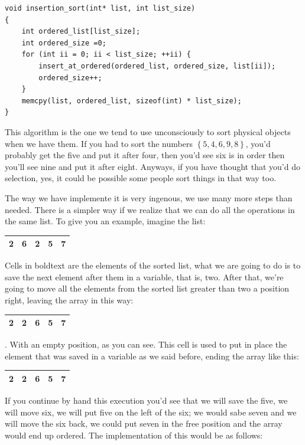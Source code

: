 \documentclass[a4paper]{article}
\begin{document}
\noindent
\begin{minipage}[H]{\linewidth}
\mbox{}
\begin{lstlisting}[style=C,
caption={Insert algorithm},
label={lst:insertionSort}]
void insertion_sort(int* list, int list_size)
{
    int ordered_list[list_size];
    int ordered_size =0;
    for (int ii = 0; ii < list_size; ++ii) {
        insert_at_ordered(ordered_list, ordered_size, list[ii]);
        ordered_size++;
    }
    memcpy(list, ordered_list, sizeof(int) * list_size);
}
\end{lstlisting}
\end{minipage}

This algorithm is the one we tend to use unconsciously to sort physical objects
when we have them. If you had to sort the numbers $\left\{5,4,6,9,8\right\}$,
you'd probably get the five and put it after four, then you'd see six is in
order then you'll see nine and put it after eight. Anyways, if you have thought
that you'd do selection, yes, it could be possible some people sort things in
that way too.

The way we have implemente it is very ingenous, we use many more steps than
needed. There is a simpler way if we realize that we can do all the operations
in the same list. To give you an example, imagine the list:
\begin{tabular}{|c|c|c|c|c|}
\hline
\textbf{2}&\textbf{6}&2&5&7\\\hline
\end{tabular}
Cells in boldtext are the elements of the sorted list, what we are going to do
is to save the next element after them in a variable, that is, two. After that,
we're going to move all the elements from the sorted list greater than two a
position right, leaving the array in this way:
\begin{tabular}{|c|c|c|c|c|}
\hline
\textbf{2}&\color{white}2\normalcolor&\textbf{6}&5&7\\\hline
\end{tabular}.
With an empty position, as you can see. This cell is used to put in place the
element that was saved in a variable as we said before, ending the array like
this:
\begin{tabular}{|c|c|c|c|c|}
\hline
\textbf{2}&\textbf{2}&\textbf{6}&5&7\\\hline
\end{tabular}
If you continue by hand this execution you'd see that we will save the five,
we will move six, we will put five on the left of the six; we would sabe seven
and we will move the six back, we could put seven in the free position and the
array would end up ordered. The implementation of this would be as follows:
\end{document}
